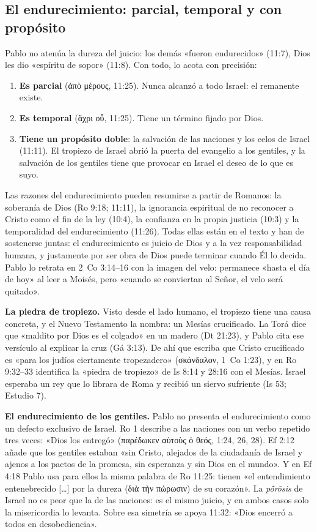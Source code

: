 \documentclass[11pt,letterpaper]{article}
\newcommand{\grc}[1]{\foreignlanguage{ancientgreek}{#1}}
\begin{document}
\subsection{El endurecimiento: parcial, temporal y con propósito}
Pablo no atenúa la dureza del juicio: los demás «fueron endurecidos» (11:7), Dios les dio «espíritu de sopor» (11:8). Con todo, lo acota con precisión:
\begin{enumerate}
\item \textbf{Es parcial} (\grc{ἀπὸ μέρους}, 11:25). Nunca alcanzó a todo Israel: el remanente existe.
\item \textbf{Es temporal} (\grc{ἄχρι οὗ}, 11:25). Tiene un término fijado por Dios.
\item \textbf{Tiene un propósito doble}: la salvación de las naciones y los celos de Israel (11:11). El tropiezo de Israel abrió la puerta del evangelio a los gentiles, y la salvación de los gentiles tiene que provocar en Israel el deseo de lo que es suyo.
\end{enumerate}
Las razones del endurecimiento pueden resumirse a partir de Romanos: la soberanía de Dios (Ro 9:18; 11:11), la ignorancia espiritual de no reconocer a Cristo como el fin de la ley (10:4), la confianza en la propia justicia (10:3) y la temporalidad del endurecimiento (11:26). Todas ellas están en el texto y han de sostenerse juntas: el endurecimiento es juicio de Dios y a la vez responsabilidad humana, y justamente por ser obra de Dios puede terminar cuando Él lo decida. Pablo lo retrata en 2~Co 3:14--16 con la imagen del velo: permanece «hasta el día de hoy» al leer a Moisés, pero «cuando se conviertan al Señor, el velo será quitado».

\textbf{La piedra de tropiezo.} Visto desde el lado humano, el tropiezo tiene una causa concreta, y el Nuevo Testamento la nombra: un Mesías crucificado. La Torá dice que «maldito por Dios es el colgado» en un madero (Dt 21:23), y Pablo cita ese versículo al explicar la cruz (Gá 3:13). De ahí que escriba que Cristo crucificado es «para los judíos ciertamente tropezadero» (\grc{σκάνδαλον}, 1~Co 1:23), y en Ro 9:32--33 identifica la «piedra de tropiezo» de Is 8:14 y 28:16 con el Mesías. Israel esperaba un rey que lo librara de Roma y recibió un siervo sufriente (Is 53; Estudio 7).

\textbf{El endurecimiento de los gentiles.} Pablo no presenta el endurecimiento como un defecto exclusivo de Israel. Ro 1 describe a las naciones con un verbo repetido tres veces: «Dios los entregó» (\grc{παρέδωκεν αὐτοὺς ὁ θεός}, 1:24, 26, 28). Ef 2:12 añade que los gentiles estaban «sin Cristo, alejados de la ciudadanía de Israel y ajenos a los pactos de la promesa, sin esperanza y sin Dios en el mundo». Y en Ef 4:18 Pablo usa para ellos la misma palabra de Ro 11:25: tienen «el entendimiento entenebrecido [\ldots] por la dureza (\grc{διὰ τὴν πώρωσιν}) de su corazón». La \emph{pṓrōsis} de Israel no es peor que la de las naciones: es el mismo juicio, y en ambos casos solo la misericordia lo levanta. Sobre esa simetría se apoya 11:32: «Dios encerró a todos en desobediencia».
\end{document}
